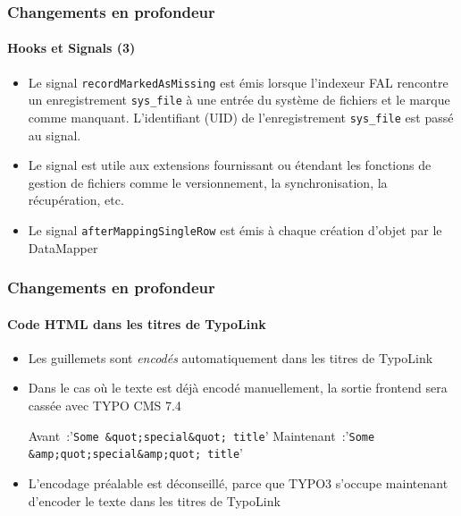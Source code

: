 \begin{frame}[fragile]
	\frametitle{Changements en profondeur}
	\framesubtitle{Hooks et Signals (3)}

	\begin{itemize}

		\item Le signal \texttt{recordMarkedAsMissing} est émis lorsque l'indexeur FAL rencontre un
			enregistrement \texttt{sys\_file} à une entrée du système de fichiers et le marque comme
			manquant. L'identifiant (UID) de l'enregistrement \texttt{sys\_file} est passé au signal.

		\item Le signal est utile aux extensions fournissant ou étendant les fonctions de gestion de fichiers
			comme le versionnement, la synchronisation, la récupération, etc.

		\item Le signal \texttt{afterMappingSingleRow} est émis à chaque création d'objet par le DataMapper

	\end{itemize}

\end{frame}


\begin{frame}[fragile]
	\frametitle{Changements en profondeur}
	\framesubtitle{Code HTML dans les titres de TypoLink}

	\lstset{basicstyle=\tiny\ttfamily}

	\begin{itemize}

		\item Les guillemets sont \textit{encodés} automatiquement dans les titres de TypoLink
		\item Dans le cas où le texte est déjà encodé manuellement,
			la sortie frontend sera cassée avec TYPO CMS 7.4

			Avant~:\tabto{2cm}'\texttt{Some \&quot;special\&quot; title}'\newline
			Maintenant~:\tabto{2cm}'\texttt{Some \&amp;quot;special\&amp;quot; title}'

		\item L'encodage préalable est déconseillé, parce que TYPO3 s'occupe maintenant
			d'encoder le texte dans les titres de TypoLink

	\end{itemize}

	\breakingchange

\end{frame}

